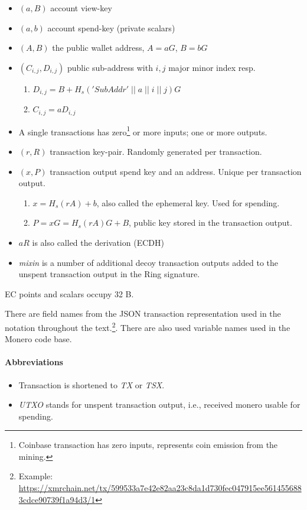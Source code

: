 \documentclass[]{article}
\begin{document}
\begin{itemize}
	\item $(a, B)$ account view-key
	\item $(a, b)$ account spend-key (private scalars)
	\item $(A, B)$ the public wallet address, $A=aG$, $B=bG$
	\item $(C_{i,j}, D_{i,j})$ public sub-address with $i, j$ major minor index resp.
	\begin{enumerate}
		\item $D_{i,j} = B + H_s('SubAddr' \; || \; a \; || \; i \; || \; j)G$
		\item $C_{i,j} = aD_{i,j}$ 
	\end{enumerate}
	\item A single transactions has zero\footnote{Coinbase transaction has zero inputs, represents coin emission from the mining.} or more inputs; one or more outputs.
	\item $(r, R)$ transaction key-pair. Randomly generated per transaction. 
	\item $(x, P)$ transaction output spend key and an address. Unique per transaction output.
	\begin{enumerate}
		\item $x = H_s(rA) + b$, also called the ephemeral key. Used for spending.
		\item $P = xG = H_s(rA)G + B$, public key stored in the transaction output.
	\end{enumerate}
	\item $aR$ is also called the derivation (ECDH)
	\item \emph{mixin} is a number of additional decoy transaction outputs added to the unspent transaction output in the Ring signature.
\end{itemize}

EC points and scalars occupy 32 B.

There are field names from the JSON transaction representation used in the notation throughout the text.\footnote{Example: \url{https://xmrchain.net/tx/599533a7e42e82aa23c8da1d730fec047915ee5614556883cdce90739f1a94d3/1}}. There are also used variable names used in the Monero code base.

\paragraph{Abbreviations}
\begin{itemize}
	\item Transaction is shortened to \emph{TX} or \emph{TSX}.
	\item \emph{UTXO} stands for unspent transaction output, i.e., received monero usable for spending.
\end{itemize}
\end{document}
